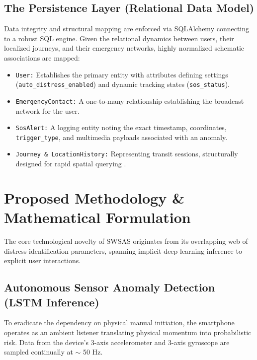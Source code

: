 \documentclass[10pt,journal,compsoc]{IEEEtran}
\begin{document}
\subsection{The Persistence Layer (Relational Data Model)}
Data integrity and structural mapping are enforced via SQLAlchemy connecting to a robust SQL engine. Given the relational dynamics between users, their localized journeys, and their emergency networks, highly normalized schematic associations are mapped:
\begin{itemize}
    \item \texttt{User:} Establishes the primary entity with attributes defining settings (\texttt{auto\_distress\_enabled}) and dynamic tracking states (\texttt{sos\_status}).
    \item \texttt{EmergencyContact:} A one-to-many relationship establishing the broadcast network for the user.
    \item \texttt{SosAlert:} A logging entity noting the exact timestamp, coordinates, \texttt{trigger\_type}, and multimedia payloads associated with an anomaly.
    \item \texttt{Journey \& LocationHistory:} Representing transit sessions, structurally designed for rapid spatial querying \cite{reddy2020}.
\end{itemize}

\section{Proposed Methodology \& Mathematical Formulation}
The core technological novelty of SWSAS originates from its overlapping web of distress identification parameters, spanning implicit deep learning inference to explicit user interactions.

\subsection{Autonomous Sensor Anomaly Detection (LSTM Inference)}
To eradicate the dependency on physical manual initiation, the smartphone operates as an ambient listener translating physical momentum into probabilistic risk. Data from the device's 3-axis accelerometer and 3-axis gyroscope are sampled continually at $\sim$ 50 Hz.
\end{document}
